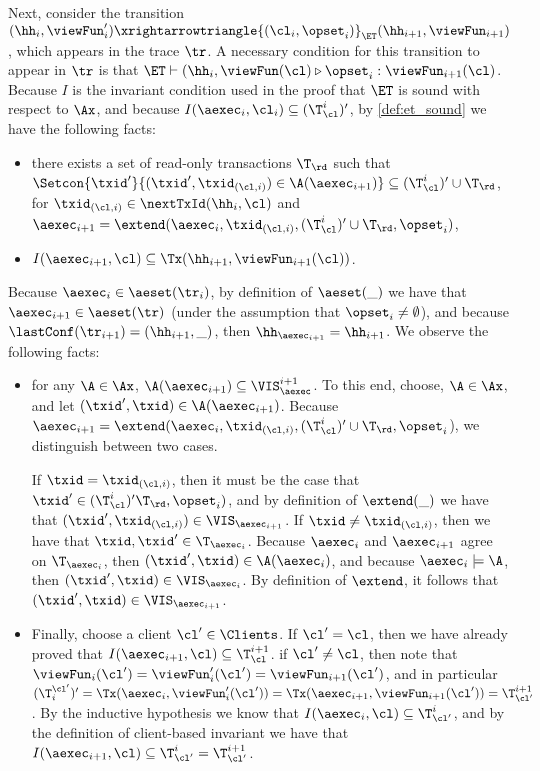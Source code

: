 Next, consider the transition $(\hh_{i}, \viewFun_{i}') \xrightarrowtriangle{(\cl_{i}, \opset_{i})}_{\ET} 
(\hh_{i+1}, \viewFun_{i+1})$, which appears in the trace $\tr$. A necessary condition for this transition 
to appear in $\tr$ is that $\ET \vdash (\hh_{i}, \viewFun(\cl) \triangleright \opset_{i}: \viewFun_{i+1}(\cl)$. 
Because $I$ is the invariant condition used in the proof that $\ET$ is sound with respect to $\Ax$, 
and because 
$I(\aexec_{i}, \cl_{i}) \subseteq (\T^{i}_{\cl})'$, 
by \cref{def:et_sound} we have the following facts: 
\begin{itemize}
\item there exists a set of read-only transactions $\T_\rd$ 
such that $\Setcon{\txid' }{ (\txid', \txid_{(\cl, i)}) \in \A(\aexec_{i+1})} \subseteq 
(\T^{i}_{\cl})' \cup \T_\rd$, for 
$\txid_{(\cl, i)} \in \nextTxId(\hh_{i}, \cl)$ and $\aexec_{i+1} = 
\extend(\aexec_{i}, \txid_{(\cl, i)}, (\T^{i}_{\cl})' \cup \T_\rd, \opset_{i})$, 
\item  $I(\aexec_{i+1}, \cl) \subseteq \Tx(\hh_{i+1}, \viewFun_{i+1}(\cl))$.
\end{itemize} 
Because $\aexec_{i} \in \aeset(\tr_{i})$, by definition of $\aeset(\_)$ we have that 
$\aexec_{i+1} \in \aeset(\tr)$ (under the assumption that $\opset_{i} \neq \emptyset$), 
and because $\lastConf(\tr_{i+1}) = (\hh_{i+1}, \_)$, then $\hh_{\aexec_{i+1}} = \hh_{i+1}$. 
We observe the following facts: 
\begin{itemize}
\item for any $\A \in \Ax$, $\A(\aexec_{i+1}) \subseteq \VIS_{\aexec}^{i+1}$. 
To this end, choose, $\A \in \Ax$, and let $(\txid', \txid) \in \A(\aexec_{i+1})$. 
Because $\aexec_{i+1} = \extend(\aexec_{i}, \txid_{(\cl, i)}, (\T_{\cl}^{i})' \cup \T_\rd, \opset_{i}$), 
we distinguish between two cases.

If $\txid = \txid_{(\cl, i)}$, then it must be the case that $\txid' \in (\T^{i}_{\cl})' \T_\rd, \opset_{i})$, 
and by definition of $\extend(\_)$ we have that $(\txid' ,\txid_{(\cl, i)}) \in \VIS_{\aexec_{i+1}}$. 
If $\txid \neq \txid_{(\cl, i)}$, then we have that $\txid, \txid' \in \T_{\aexec_{i}}$. Because 
$\aexec_{i}$ and $\aexec_{i+1}$ agree on $\T_{\aexec_{i}}$, then $(\txid', \txid) \in \A(\aexec_{i})$, 
and because $\aexec_{i} \models \A$, then $(\txid', \txid) \in \VIS_{\aexec_{i}}$. By definition of 
$\extend$, it follows that $(\txid', \txid) \in \VIS_{\aexec_{i+1}}$.

\item Finally, choose a client $\cl' \in \Clients$. If $\cl' = \cl$, then we have already proved that 
$I(\aexec_{i+1}, \cl) \subseteq \T_{\cl}^{i+1}$. 
if $\cl' \neq \cl$, then note that $\viewFun_{i}(\cl') = \viewFun'_{i}(\cl') = \viewFun_{i+1}(\cl')$, 
and in particular $(\T^{\cl'}_{i})' = \Tx(\aexec_{i}, \viewFun'_{i}(\cl')) = \Tx(\aexec_{i+1}, \viewFun_{i+1}(\cl')) =  \T_{\cl'}^{i+1}$.
By the inductive hypothesis we know that $I(\aexec_{i}, \cl) \subseteq \T_{\cl'}^{i}$, 
and by the definition of client-based invariant we have that $I(\aexec_{i+1}, \cl) \subseteq \T_{\cl'}^{i} = \T_{\cl'}^{i+1}$. 
\end{itemize}

